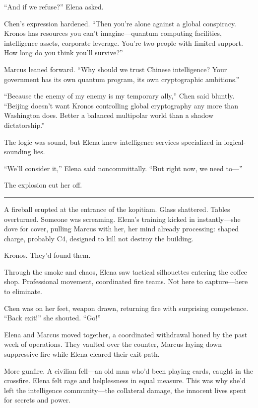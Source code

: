 ``And if we refuse?'' Elena asked.

Chen's expression hardened. ``Then you're alone against a global
conspiracy. Kronos has resources you can't imagine---quantum computing
facilities, intelligence assets, corporate leverage. You're two people
with limited support. How long do you think you'll survive?''

Marcus leaned forward. ``Why should we trust Chinese intelligence? Your
government has its own quantum program, its own cryptographic
ambitions.''

``Because the enemy of my enemy is my temporary ally,'' Chen said
bluntly. ``Beijing doesn't want Kronos controlling global cryptography
any more than Washington does. Better a balanced multipolar world than a
shadow dictatorship.''

The logic was sound, but Elena knew intelligence services specialized in
logical-sounding lies.

``We'll consider it,'' Elena said noncommittally. ``But right now, we
need to---''

The explosion cut her off.

\begin{center}\rule{0.5\linewidth}{0.5pt}\end{center}

A fireball erupted at the entrance of the kopitiam. Glass shattered.
Tables overturned. Someone was screaming. Elena's training kicked in
instantly---she dove for cover, pulling Marcus with her, her mind
already processing: shaped charge, probably C4, designed to kill not
destroy the building.

Kronos. They'd found them.

Through the smoke and chaos, Elena saw tactical silhouettes entering the
coffee shop. Professional movement, coordinated fire teams. Not here to
capture---here to eliminate.

Chen was on her feet, weapon drawn, returning fire with surprising
competence. ``Back exit!'' she shouted. ``Go!''

Elena and Marcus moved together, a coordinated withdrawal honed by the
past week of operations. They vaulted over the counter, Marcus laying
down suppressive fire while Elena cleared their exit path.

More gunfire. A civilian fell---an old man who'd been playing cards,
caught in the crossfire. Elena felt rage and helplessness in equal
measure. This was why she'd left the intelligence community---the
collateral damage, the innocent lives spent for secrets and power.


